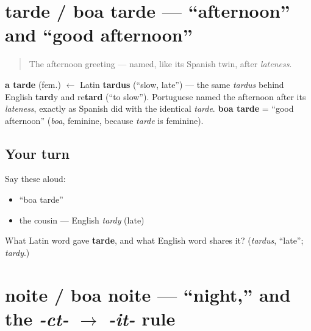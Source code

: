 \section[tarde / boa tarde]{tarde / boa tarde — \textquotedblleft{}afternoon\textquotedblright{} and \textquotedblleft{}good afternoon\textquotedblright{}}

\label{lesson:PT-C01-tarde}



\begin{quote}
The afternoon greeting — named, like its Spanish twin, after \emph{lateness}.
\end{quote}

\begin{cousinweb}
\textbf{a tarde} (fem.) $\leftarrow$ Latin \textbf{tardus} (\textquotedblleft{}slow, late\textquotedblright{}) — the same \emph{tardus} behind English \textbf{tard}y and re\textbf{tard} (\textquotedblleft{}to slow\textquotedblright{}). Portuguese named the afternoon after its \emph{lateness}, exactly as Spanish did with the identical \emph{tarde}. \textbf{boa tarde} = \textquotedblleft{}good afternoon\textquotedblright{} (\emph{boa}, feminine, because \emph{tarde} is feminine).
\end{cousinweb}

\subsection*{Your turn}
Say these aloud:

\begin{itemize}
\raggedright
  \item \textquotedblleft{}boa tarde\textquotedblright{}
  \item the cousin — English \emph{tardy} (late)
\end{itemize}

\begin{tcolorbox}[breakable,colback=teal!4,colframe=teal!35!black,title={Before you move on}]
What Latin word gave \textbf{tarde}, and what English word shares it? (\emph{tardus}, \textquotedblleft{}late\textquotedblright{}; \emph{tardy}.)
\end{tcolorbox}
\section[noite / boa noite]{noite / boa noite — \textquotedblleft{}night,\textquotedblright{} and the \emph{-ct-} $\to$ \emph{-it-} rule}

\label{lesson:PT-C01-noite}



